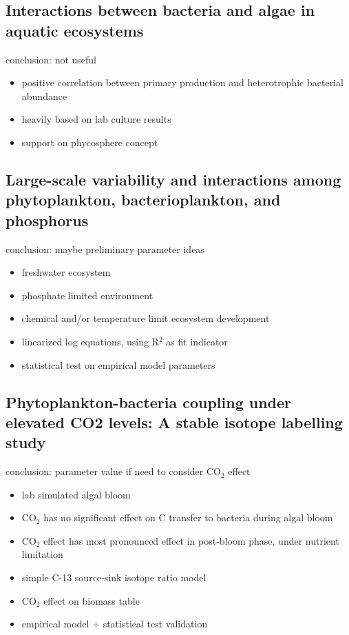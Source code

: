 \documentclass[a4paper,11pt]{article}
\begin{document}
    \subsection{Interactions between bacteria and algae in aquatic ecosystems\autocite{cole1982interactions}}
    conclusion: not useful
    \begin{itemize}
        \item positive correlation between primary production and heterotrophic bacterial abundance
        \item heavily based on lab culture results
        \item support on phycosphere concept
    \end{itemize}
    
    \subsection{Large-scale variability and interactions among phytoplankton, bacterioplankton, and phosphorus\autocite{currie1990large}}
    conclusion: maybe preliminary parameter ideas
    \begin{itemize}
        \item freshwater ecosystem
        \item phosphate limited environment
        \item chemical and/or temperature limit ecosystem development
        \item linearized log equations, using R$^2$ as fit indicator
        \item statistical test on empirical model parameters
    \end{itemize}
    
    \subsection{Phytoplankton-bacteria coupling under elevated CO2 levels: A stable isotope labelling study\autocite{de2010phytoplankton}}
    conclusion: parameter value if need to consider CO$_2$ effect
    \begin{itemize}
        \item lab simulated algal bloom
        \item CO$_2$ has no significant effect on C transfer to bacteria during algal bloom
        \item CO$_2$ effect has most pronounced effect in post-bloom phase, under nutrient limitation
        \item simple C-13 source-sink isotope ratio model
        \item CO$_2$ effect on biomass table
        \item empirical model + statistical test validation
    \end{itemize}
    
\end{document}

